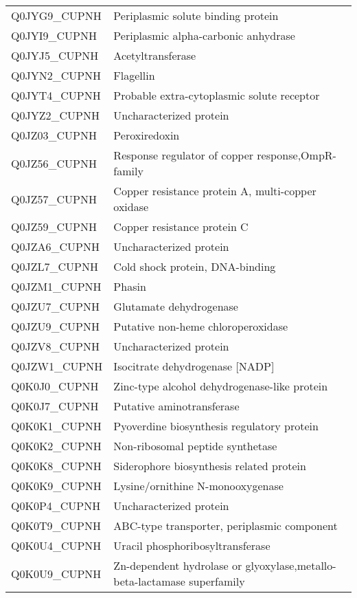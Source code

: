 \begin{center}
\begin{longtable}{ l l }
Q0JYG9\_CUPNH & Periplasmic solute binding protein \\ [0.5ex]
Q0JYI9\_CUPNH & Periplasmic alpha-carbonic anhydrase \\ [0.5ex]
Q0JYJ5\_CUPNH & Acetyltransferase \\ [0.5ex]
Q0JYN2\_CUPNH & Flagellin \\ [0.5ex]
Q0JYT4\_CUPNH & Probable extra-cytoplasmic solute receptor \\ [0.5ex]
Q0JYZ2\_CUPNH & Uncharacterized protein \\ [0.5ex]
Q0JZ03\_CUPNH & Peroxiredoxin \\ [0.5ex]
Q0JZ56\_CUPNH & Response regulator of copper response,OmpR-family \\ [0.5ex]
Q0JZ57\_CUPNH & Copper resistance protein A, multi-copper oxidase \\ [0.5ex]
Q0JZ59\_CUPNH & Copper resistance protein C \\ [0.5ex]
Q0JZA6\_CUPNH & Uncharacterized protein \\ [0.5ex]
Q0JZL7\_CUPNH & Cold shock protein, DNA-binding \\ [0.5ex]
Q0JZM1\_CUPNH & Phasin \\ [0.5ex]
Q0JZU7\_CUPNH & Glutamate dehydrogenase \\ [0.5ex]
Q0JZU9\_CUPNH & Putative non-heme chloroperoxidase \\ [0.5ex]
Q0JZV8\_CUPNH & Uncharacterized protein \\ [0.5ex]
Q0JZW1\_CUPNH & Isocitrate dehydrogenase [NADP] \\ [0.5ex]
Q0K0J0\_CUPNH & Zinc-type alcohol dehydrogenase-like protein \\ [0.5ex]
Q0K0J7\_CUPNH & Putative aminotransferase \\ [0.5ex]
Q0K0K1\_CUPNH & Pyoverdine biosynthesis regulatory protein \\ [0.5ex]
Q0K0K2\_CUPNH & Non-ribosomal peptide synthetase \\ [0.5ex]
Q0K0K8\_CUPNH & Siderophore biosynthesis related protein \\ [0.5ex]
Q0K0K9\_CUPNH & Lysine/ornithine N-monooxygenase \\ [0.5ex]
Q0K0P4\_CUPNH & Uncharacterized protein \\ [0.5ex]
Q0K0T9\_CUPNH & ABC-type transporter, periplasmic component \\ [0.5ex]
Q0K0U4\_CUPNH & Uracil phosphoribosyltransferase \\ [0.5ex]
Q0K0U9\_CUPNH & Zn-dependent hydrolase or glyoxylase,metallo-beta-lactamase superfamily \\ [0.5ex]

\end{longtable}
\end{center}
